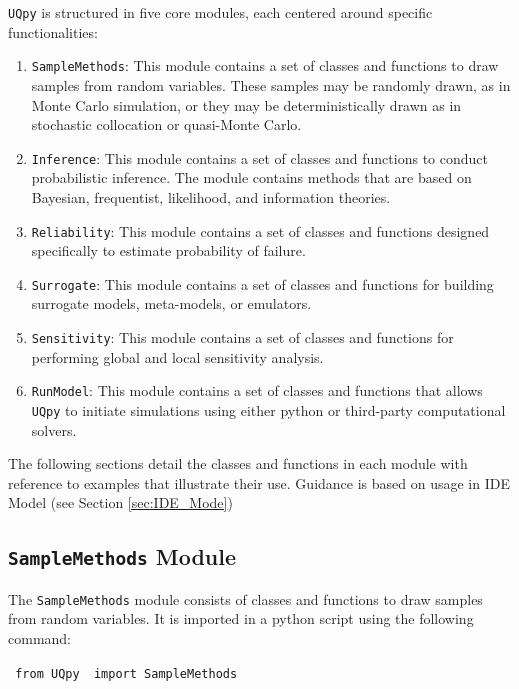 \texttt{UQpy} is structured in five core modules, each centered around specific functionalities:
\begin{enumerate}
\item \texttt{SampleMethods}: This module contains a set of classes and functions to draw samples from random variables. These samples may be randomly drawn, as in Monte Carlo simulation, or they may be deterministically drawn as in stochastic collocation or quasi-Monte Carlo.
\item \texttt{Inference}: This module contains a set of classes and functions to conduct probabilistic inference. The module contains methods that are based on Bayesian, frequentist, likelihood, and information theories. 
\item \texttt{Reliability}: This module contains a set of classes and functions designed specifically to estimate probability of failure.
\item \texttt{Surrogate}: This module contains a set of classes and functions for building surrogate models, meta-models, or emulators.
\item \texttt{Sensitivity}: This module contains a set of classes and functions for performing global and local sensitivity analysis.
\item \texttt{RunModel}: This module contains a set of classes and functions that allows \texttt{UQpy} to initiate simulations using either python or third-party computational solvers.
\end{enumerate}
The following sections detail the classes and functions in each module with reference to examples that illustrate their use. Guidance is based on usage in IDE Model (see Section \ref{sec:IDE_Mode})


\subsection{\texttt{SampleMethods} Module}

The \texttt{SampleMethods} module consists of classes and functions to draw samples from random variables. It is imported in a python script using the following command:

\vspace{4mm}
\texttt{{\color{blue} from} \texttt{UQpy} {\color{blue} import} SampleMethods }
\vspace{4mm}


